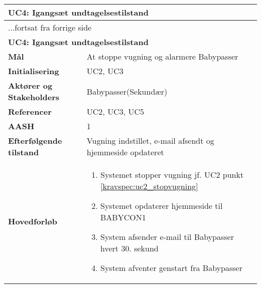 \begin{center} \centering \label{kravspec:uc4}
	\begin{longtable}{|p{5cm}|p{9cm}|}  %
	\hline
		\multicolumn{2}{|l|}{\textbf{UC4: Igangsæt undtagelsestilstand}} \\\hline %
		\endfirsthead
		
		\multicolumn{2}{l}{...fortsat fra forrige side} \\ \hline %
		\multicolumn{2}{|l|}{\textbf{UC4: Igangsæt undtagelsestilstand}} \\\hline %
		\endhead	
		
		\textbf{Mål}							&At stoppe vugning og alarmere Babypasser		\\\hline
		\textbf{Initialisering}				&UC2, UC3		\\\hline
		\textbf{Aktører og Stakeholders}		&Babypasser(Sekundær)	\\\hline 
		\textbf{Referencer}					&UC2, UC3, UC5		\\\hline
		\textbf{AASH}						&1		\\\hline
		\textbf{Efterfølgende tilstand}		&Vugning indstillet, e-mail afsendt og hjemmeside opdateret 		\\\hline
		\textbf{Hovedforløb}					
			&\begin{enumerate}
				
				\item Systemet stopper vugning jf. UC2 punkt \ref{kravspec:uc2_stopvugning} 							
				
				\item \label{kravspec:uc4_opdaterweb}Systemet opdaterer hjemmeside til BABYCON1				
				\newline [Und: \ref{kravspec:uc4_opdaterweb}.a Ingen netværksforbindelse]
				
				\item \label{kravspec:uc4_emailafsend}System afsender e-mail til Babypasser hvert 30. sekund
				\newline [Und: \ref{kravspec:uc4_emailafsend}.a Ingen netværksforbindelse]
				
				\item System afventer genstart fra Babypasser
				

\end{enumerate}
\end{longtable}
\end{center}
